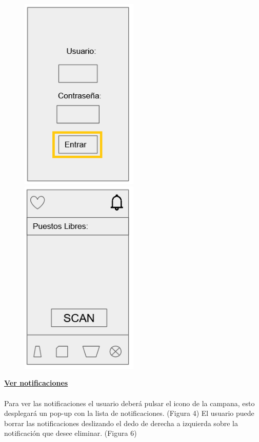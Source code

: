 \documentclass[12pt]{article}
\begin{document}
\begin{figure}[!h]
\centering
{}
	\includegraphics[width=0.5\textwidth]{login.png} 
\endminipage
{}
	\includegraphics[width=0.5\textwidth]{dashboard.png} 
\endminipage
\end{figure}

\textbf{\underline{Ver notificaciones}} \\
\\
Para ver las notificaciones el usuario deberá pulsar el icono de la campana, esto desplegará un pop-up con la lista de notificaciones. (Figura 4)
El usuario puede borrar las notificaciones deslizando el dedo de derecha a izquierda sobre la notificación que desee eliminar. (Figura 6)\\
\end{document}
